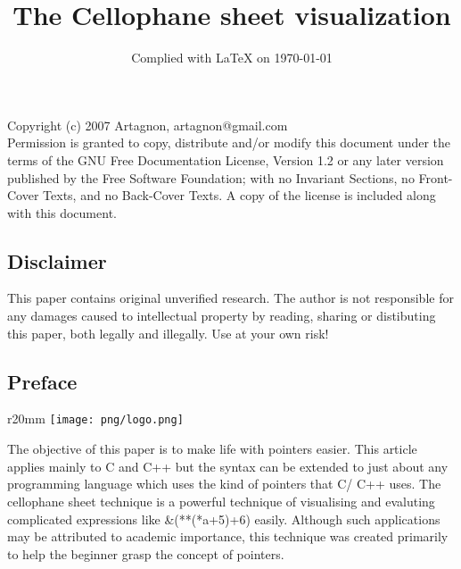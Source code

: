 \documentclass[10pt,twoside]{article}
\begin{document}
\title{The Cellophane sheet visualization}
\date{Complied with \LaTeX{} on \today}
\maketitle
\begin{center}
{\scriptsize Copyright (c) 2007 Artagnon, artagnon@gmail.com\\ Permission is
granted to copy, distribute and/or modify this document under the terms of the
GNU Free Documentation License, Version 1.2 or any later version published by
the Free Software Foundation; with no Invariant Sections, no Front-Cover Texts,
and no Back-Cover Texts.  A copy of the license is included along with this
document.  }
\end{center}

\subsection*{Disclaimer}
This paper contains original unverified research. The author is not responsible
for any damages caused to intellectual property by reading, sharing or
distibuting this paper, both legally and illegally. Use at your own risk!

\subsection*{Preface}

\begin{wrapfigure}{r}{20mm}
\texttt{[image: png/logo.png]}
\end{wrapfigure}

The objective of this paper is to make life with pointers easier. This article
applies mainly to C and C++ but the syntax can be extended to just about any
programming language which uses the kind of pointers that C/ C++ uses. The
cellophane sheet technique is a powerful technique of visualising and evaluting
complicated expressions like \&(**(*a+5)+6) easily. Although such applications
may be attributed to academic importance, this technique was created primarily
to help the beginner grasp the concept of pointers.
\end{document}
